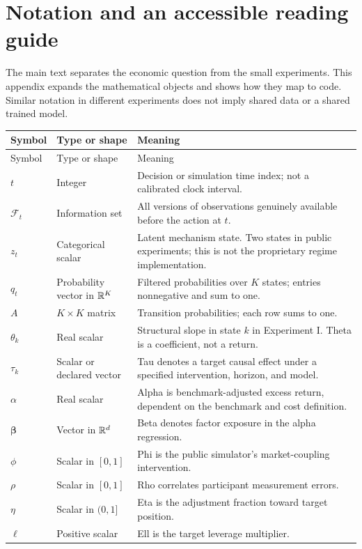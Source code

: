 \clearpage
\appendix
\section{Notation and an accessible reading guide}
The main text separates the economic question from the small experiments. This appendix expands the mathematical objects and shows how they map to code. Similar notation in different experiments does not imply shared data or a shared trained model.

\begin{longtable}{p{.14\linewidth}p{.2\linewidth}p{.58\linewidth}}
\toprule Symbol & Type or shape & Meaning\\\midrule\endfirsthead
\toprule Symbol & Type or shape & Meaning\\\midrule\endhead
\bottomrule\endfoot
$t$ & Integer & Decision or simulation time index; not a calibrated clock interval.\\
$\mathcal F_t$ & Information set & All versions of observations genuinely available before the action at $t$.\\
$z_t$ & Categorical scalar & Latent mechanism state. Two states in public experiments; this is not the proprietary regime implementation.\\
$q_t$ & Probability vector in $\mathbb R^K$ & Filtered probabilities over $K$ states; entries nonnegative and sum to one.\\
$A$ & $K\times K$ matrix & Transition probabilities; each row sums to one.\\
$\theta_k$ & Real scalar & Structural slope in state $k$ in Experiment I. Theta is a coefficient, not a return.\\
$\tau_k$ & Scalar or declared vector & Tau denotes a target causal effect under a specified intervention, horizon, and model.\\
$\alpha$ & Real scalar & Alpha is benchmark-adjusted excess return, dependent on the benchmark and cost definition.\\
$\boldsymbol\beta$ & Vector in $\mathbb R^d$ & Beta denotes factor exposure in the alpha regression.\\
$\phi$ & Scalar in $[0,1]$ & Phi is the public simulator's market-coupling intervention.\\
$\rho$ & Scalar in $[0,1]$ & Rho correlates participant measurement errors.\\
$\eta$ & Scalar in $(0,1]$ & Eta is the adjustment fraction toward target position.\\
$\ell$ & Positive scalar & Ell is the target leverage multiplier.\\

\end{longtable}

